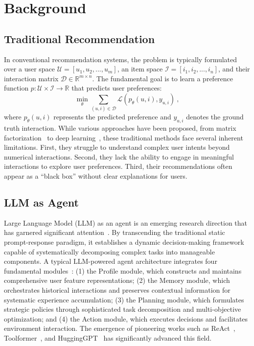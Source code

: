 \section{Background}

\subsection{Traditional Recommendation} 

In conventional recommendation systems, the problem is typically formulated over a user space $\mathcal{U} = {[u_1, u_2, ..., u_m]}$, an item space $\mathcal{I} = {[i_1, i_2, ..., i_n]}$, and their interaction matrix $\mathcal{D} \in \mathbb{R}^{m \times n}$. The fundamental goal is to learn a preference function $p: \mathcal{U} \times \mathcal{I} \rightarrow \mathbb{R}$ that predicts user preferences:
\begin{equation}
\min_{\theta} \sum_{(u,i) \in \mathcal{D}} \mathcal{L}(p_{\theta}(u,i), y_{u,i}) \ ,
\end{equation}
where $p_{\theta}(u,i)$ represents the predicted preference and $y_{u,i}$ denotes the ground truth interaction. 
While various approaches have been proposed, from matrix factorization~\cite{hu2008collaborative} to deep learning~\cite{he2017neural}, these traditional methods face several inherent limitations. 
First, they struggle to understand complex user intents beyond numerical interactions. 
Second, they lack the ability to engage in meaningful interactions to explore user preferences. 
Third, their recommendations often appear as a ``black box'' without clear explanations for users.


\subsection{LLM as Agent}

Large Language Model (LLM) as an agent is an emerging research direction that has garnered significant attention~\cite{park2023generative}. 
By transcending the traditional static prompt-response paradigm, it establishes a dynamic decision-making framework~\cite{patil2023gorilla} capable of systematically decomposing complex tasks into manageable components. 
A typical LLM-powered agent architecture integrates four fundamental modules~\cite{wang2024survey}: (1) the Profile module, which constructs and maintains comprehensive user feature representations; (2) the Memory module, which orchestrates historical interactions and preserves contextual information for systematic experience accumulation; (3) the Planning module, which formulates strategic policies through sophisticated task decomposition and multi-objective optimization; and (4) the Action module, which executes decisions and facilitates environment interaction. 
The emergence of pioneering works such as ReAct~\cite{react}, Toolformer~\cite{toolformer}, and HuggingGPT~\cite{hugginggpt} has significantly advanced this field.



